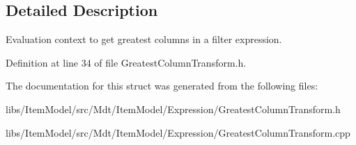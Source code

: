 \subsection{Detailed Description}
Evaluation context to get greatest columns in a filter expression. 

Definition at line 34 of file Greatest\+Column\+Transform.\+h.



The documentation for this struct was generated from the following files\+:\begin{DoxyCompactItemize}
\item 
libs/\+Item\+Model/src/\+Mdt/\+Item\+Model/\+Expression/Greatest\+Column\+Transform.\+h\item 
libs/\+Item\+Model/src/\+Mdt/\+Item\+Model/\+Expression/Greatest\+Column\+Transform.\+cpp\end{DoxyCompactItemize}
